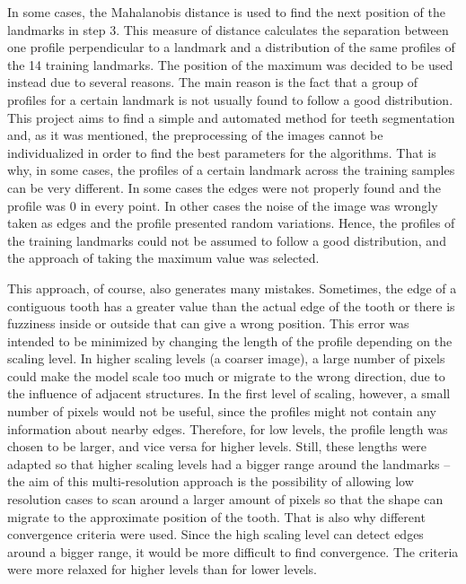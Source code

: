 \documentclass[a4paper,11pt,twoside]{article}
\begin{document}
In some cases, the Mahalanobis distance \cite{mahalanobis} is used to find the next position of the landmarks in step 3. This measure of distance calculates the separation between one profile perpendicular to a landmark and a distribution of the same profiles of the 14 training landmarks. The position of the maximum was decided to be used instead due to several reasons. The main reason is the fact that a group of profiles for a certain landmark is not usually found to follow a good distribution. This project aims to find a simple and automated method for teeth segmentation and, as it was mentioned, the preprocessing of the images cannot be individualized in order to find the best parameters for the algorithms. That is why, in some cases, the profiles of a certain landmark across the training samples can be very different. In some cases the edges were not properly found and the profile was 0 in every point. In other cases the noise of the image was wrongly taken as edges and the profile presented random variations. Hence, the profiles of the training landmarks could not be assumed to follow a good distribution, and the approach of taking the maximum value was selected.

This approach, of course, also generates many mistakes. Sometimes, the edge of a contiguous tooth has a greater value than the actual edge of the tooth or there is fuzziness inside or outside that can give a wrong position. This error was intended to be minimized by changing the length of the profile depending on the scaling level. In higher scaling levels (a coarser image), a large number of pixels could make the model scale too much or migrate to the wrong direction, due to the influence of adjacent structures. In the first level of scaling, however, a small number of pixels would not be useful, since the profiles might not contain any information about nearby edges. Therefore, for low levels, the profile length was chosen to be larger, and vice versa for higher levels. Still, these lengths were adapted so that higher scaling levels had a bigger range around the landmarks -- the aim of this multi-resolution approach is the possibility of allowing low resolution cases to scan around a larger amount of pixels so that the shape can migrate to the approximate position of the tooth. That is also why different convergence criteria were used. Since the high scaling level can detect edges around a bigger range, it would be more difficult to find convergence. The criteria were more relaxed for higher levels than for lower levels.
\end{document}
